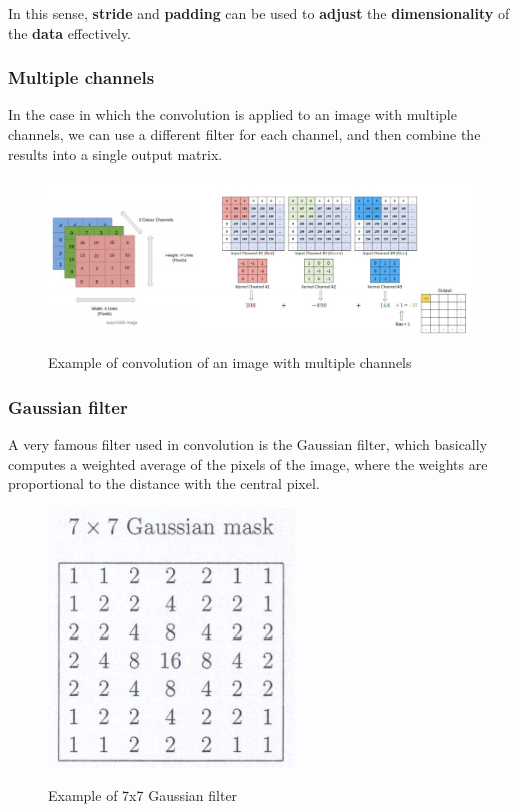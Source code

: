 In this sense, \textbf{stride} and \textbf{padding} can be used to \textbf{adjust} the \textbf{dimensionality} of the \textbf{data} effectively.

\subsubsection{Multiple channels}

In the case in which the convolution is applied to an image with multiple channels, we can use a different filter for each channel, and then combine the results into a single output matrix.

\begin{figure}[h!]
		\centering
        \includegraphics[scale = 1.5]{img/convolution with multiple channes.jpg}
		\label{mi}
        \caption{Example of convolution of an image with multiple channels}
\end{figure}

\subsubsection{Gaussian filter}

A very famous filter used in convolution is the Gaussian filter, which basically computes a weighted average of the pixels of the image, where the weights are proportional to the distance with the central pixel.

\begin{figure}[h!]
		\centering
        \includegraphics[scale = 1.5]{img/gaussian filter.jpg}
		\label{mi}
        \caption{Example of 7x7 Gaussian filter}
\end{figure}

